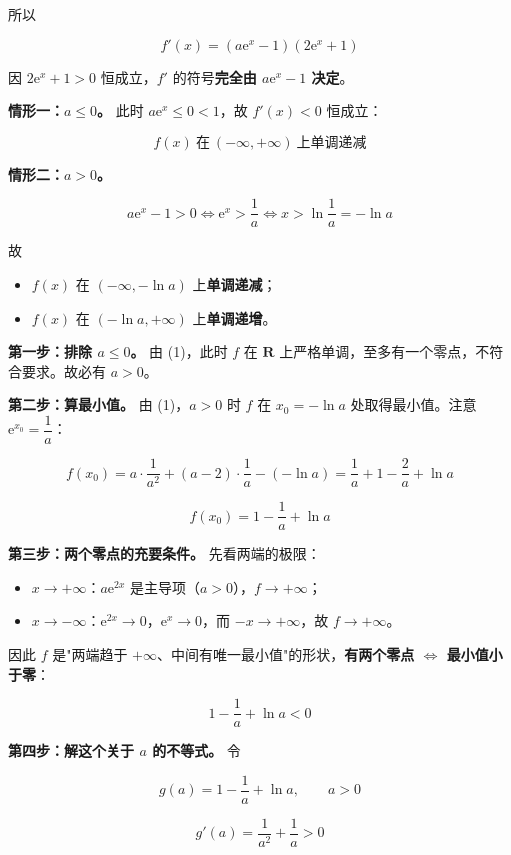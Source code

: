 所以

\[f'(x)=\left(a\mathrm e^{x}-1\right)\left(2\mathrm e^{x}+1\right)\]

因 $2\mathrm e^{x}+1>0$ 恒成立，$f'$ 的符号\textbf{完全由 $a\mathrm e^{x}-1$ 决定}。

\textbf{情形一：$a\le0$。} 此时 $a\mathrm e^{x}\le0<1$，故 $f'(x)<0$ 恒成立：

\[f(x)\ \text{在}\ (-\infty,+\infty)\ \text{上单调递减}\]

\textbf{情形二：$a>0$。}

\[a\mathrm e^{x}-1>0\iff\mathrm e^{x}>\frac1a\iff x>\ln\frac1a=-\ln a\]

故

\begin{itemize}
\item $f(x)$ 在 $(-\infty,-\ln a)$ 上\textbf{单调递减}；
\item $f(x)$ 在 $(-\ln a,+\infty)$ 上\textbf{单调递增}。
\end{itemize}


\textbf{第一步：排除 $a\le0$。} 由 (1)，此时 $f$ 在 $\mathbf R$ 上严格单调，至多有一个零点，不符合要求。故必有 $a>0$。

\textbf{第二步：算最小值。} 由 (1)，$a>0$ 时 $f$ 在 $x_0=-\ln a$ 处取得最小值。注意 $\mathrm e^{x_0}=\dfrac1a$：

\[f\left(x_0\right)=a\cdot\frac1{a^{2}}+(a-2)\cdot\frac1a-\left(-\ln a\right)=\frac1a+1-\frac2a+\ln a\]

\[f\left(x_0\right)=1-\frac1a+\ln a\]

\textbf{第三步：两个零点的充要条件。} 先看两端的极限：

\begin{itemize}
\item $x\to+\infty$：$a\mathrm e^{2x}$ 是主导项（$a>0$），$f\to+\infty$；
\item $x\to-\infty$：$\mathrm e^{2x}\to0$，$\mathrm e^{x}\to0$，而 $-x\to+\infty$，故 $f\to+\infty$。
\end{itemize}

因此 $f$ 是"两端趋于 $+\infty$、中间有唯一最小值"的形状，\textbf{有两个零点 $\iff$ 最小值小于零}：

\[1-\frac1a+\ln a<0\]

\textbf{第四步：解这个关于 $a$ 的不等式。} 令

\[g(a)=1-\frac1a+\ln a,\qquad a>0\]

\[g'(a)=\frac1{a^{2}}+\frac1a>0\]

